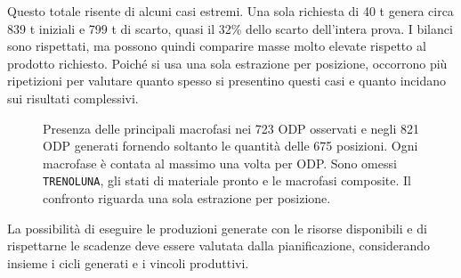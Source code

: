 Questo totale risente di alcuni casi estremi. Una sola richiesta di 40 t genera circa 839 t iniziali e 799 t di scarto, quasi il 32\% dello scarto dell'intera prova. I bilanci sono rispettati, ma possono quindi comparire masse molto elevate rispetto al prodotto richiesto. Poiché si usa una sola estrazione per posizione, occorrono più ripetizioni per valutare quanto spesso si presentino questi casi e quanto incidano sui risultati complessivi.

\begin{figure}[H]
\centering
{}
\caption{Presenza delle principali macrofasi nei 723 ODP osservati e negli 821 ODP generati fornendo soltanto le quantità delle 675 posizioni. Ogni macrofase è contata al massimo una volta per ODP. Sono omessi \texttt{TRENOLUNA}, gli stati di materiale pronto e le macrofasi composite. Il confronto riguarda una sola estrazione per posizione.}
\label{fig:cascade-generation-phases}
\end{figure}

La possibilità di eseguire le produzioni generate con le risorse disponibili e di rispettarne le scadenze deve essere valutata dalla pianificazione, considerando insieme i cicli generati e i vincoli produttivi.
